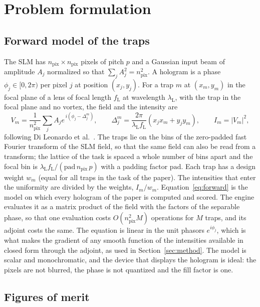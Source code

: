 \section{Problem formulation}\label{sec:problem}

\subsection{Forward model of the traps}

The SLM has $n_{\mathrm{pix}}\times n_{\mathrm{pix}}$ pixels of pitch $p$ and a Gaussian input beam of amplitude $A_j$ normalized so that $\sum_jA_j^2=n_{\mathrm{pix}}^2$. A hologram is a phase $\phi_j\in[0,2\pi)$ per pixel $j$ at
position $(x_j,y_j)$. For a trap $m$ at $(x_m,y_m)$ in the focal plane of a lens of focal length $f_{\mathrm L}$ at wavelength $\lambda_{\mathrm L}$, with the trap in the focal plane and no vortex, the field and the intensity are
\begin{equation}
V_m=\frac1{n_{\mathrm{pix}}^2}\sum_jA_je^{\,i(\phi_j-\Delta_j^m)},\qquad \Delta_j^m=\frac{2\pi}{\lambda_{\mathrm L} f_{\mathrm L}}(x_jx_m+y_jy_m),\qquad I_m=|V_m|^2,\label{eq:forward}
\end{equation}
following Di Leonardo et al.~\cite{dileonardo}. The traps lie on the bins of the zero-padded fast Fourier transform of the SLM field, so that the same field can also be read from a transform; the lattice of the task is spaced a whole number of bins apart and the
focal bin is $\lambda_{\mathrm L} f_{\mathrm L}/(\mathrm{pad}\,n_{\mathrm{pix}}\,p)$ with a padding factor $\mathrm{pad}$. Each trap has a design weight $w_m$ (equal for all traps in the task of the paper). The intensities that enter the uniformity are divided by the weights, $I_m/w_m$.
Equation~\ref{eq:forward} is the model on which every hologram of the paper is computed and scored. The engine evaluates it as a matrix product of the field with the factors of the separable phase, so that one evaluation costs $O(n_{\mathrm{pix}}^2M)$ operations for $M$ traps, and its adjoint costs the same.
The equation is linear in the unit phasors $e^{i\phi_j}$, which is what makes the gradient of any smooth function of the intensities available in closed form through the adjoint, as used in Section~\ref{sec:method}. The model is scalar and monochromatic, and the device that displays the hologram is ideal: the pixels are not blurred, the phase is not quantized and the fill factor is one.

\subsection{Figures of merit}


